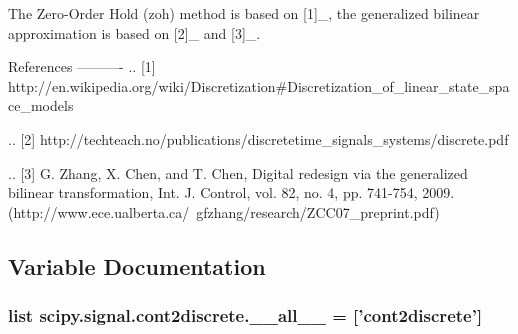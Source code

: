 \begin{DoxyVerb}
The Zero-Order Hold (zoh) method is based on [1]_, the generalized bilinear
approximation is based on [2]_ and [3]_.

References
----------
.. [1] http://en.wikipedia.org/wiki/Discretization#Discretization_of_linear_state_space_models

.. [2] http://techteach.no/publications/discretetime_signals_systems/discrete.pdf

.. [3] G. Zhang, X. Chen, and T. Chen, Digital redesign via the generalized
    bilinear transformation, Int. J. Control, vol. 82, no. 4, pp. 741-754,
    2009.
    (http://www.ece.ualberta.ca/~gfzhang/research/ZCC07_preprint.pdf)\end{DoxyVerb}
 

\subsection{Variable Documentation}
\hypertarget{namespacescipy_1_1signal_1_1cont2discrete_ace13df92f3015de5a92827be014c5c5f}{}
\subsubsection[{\+\_\+\+\_\+all\+\_\+\+\_\+}]{\setlength{\rightskip}{0pt plus 5cm}list scipy.\+signal.\+cont2discrete.\+\_\+\+\_\+all\+\_\+\+\_\+ = \mbox{[}'{\bf cont2discrete}'\mbox{]}}\label{namespacescipy_1_1signal_1_1cont2discrete_ace13df92f3015de5a92827be014c5c5f}

